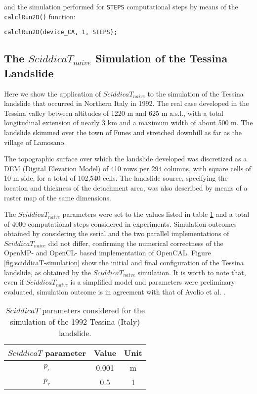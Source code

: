 \noindent and the simulation performed for \verb'STEPS'
computational steps by means of the \verb'calclRun2D()' function:

\begin{lstlisting}[basicstyle=\footnotesize, numbers=none]
calclRun2D(device_CA, 1, STEPS);
\end{lstlisting}

\subsection{The $SciddicaT_{naive}$ Simulation of the Tessina Landslide}
Here we show the application of $SciddicaT_{naive}$ to the
simulation of the Tessina landslide \cite{avolio2000simulation} that
occurred in Northern Italy in 1992. The real case developed in the
Tessina valley between altitudes of 1220 m and 625 m a.s.l., with a
total longitudinal extension of nearly 3 km and a maximum width of
about 500 m. The landslide skimmed over the town of Funes and
stretched downhill as far as the village of Lamosano.

The topographic surface over which the landslide developed was
discretized as a DEM (Digital Elevation Model) of 410 rows per 294
columns, with square cells of 10 m side, for a total of 102,540
cells. The landslide source, specifying the location and thickness
of the detachment area, was also described by means of a raster map
of the same dimensions.

The $SciddicaT_{naive}$ parameters were set to the values listed in
table \ref{tab:sciddicaT-params} and a total of 4000 computational
steps considered in experiments. Simulation outcomes obtained by
considering the serial and the two parallel implementations of
$SciddicaT_{naive}$ did not differ, confirming the numerical
correctness of the OpenMP- and OpenCL- based implementation of
OpenCAL. Figure \ref{fig:sciddicaT-simulation} show the initial and
final configuration of the Tessina landslide, as obtained by the
$SciddicaT_{naive}$ simulation. It is worth to note that, even if
$SciddicaT_{naive}$ is a simplified model and parameters were
preliminary evaluated, simulation outcome is in agreement with that
of Avolio et al. \cite{avolio2000simulation}.
\begin{table}
	\centering
	\begin{tabular}{ccc}
		\hline $SciddicaT$ parameter & Value & Unit \\ \hline
		$p_\epsilon$ & 0.001 & \si{m}\\ $p_r$ & 0.5 & 1\\ \hline
	\end{tabular}
	\caption{$SciddicaT$ parameters considered for the simulation of the 1992
		Tessina (Italy) landslide.}
	\label{tab:sciddicaT-params}
\end{table}


